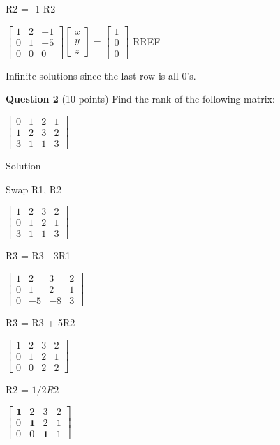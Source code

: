 \documentclass{article}
\begin{document}
R2 = -1 R2

$\begin{bmatrix}
1 & 2 & -1 \\
0 & 1 & -5\\
0 & 0 & 0
\end{bmatrix}\begin{bmatrix}
x \\ y \\ z    
\end{bmatrix} = \begin{bmatrix}
    1 \\ 0 \\ 0
\end{bmatrix}$ RREF

Infinite solutions since the last row is all 0's.

\vspace{2em}
\noindent
\textbf{Question 2} (10 points) Find the rank of the following matrix:

$\begin{bmatrix}
0 & 1 & 2 & 1 \\
1 & 2 & 3 & 2 \\
3 & 1 & 1 & 3 
\end{bmatrix}$ 

Solution

Swap R1, R2

$\begin{bmatrix}
    1 & 2 & 3 & 2 \\
    0 & 1 & 2 & 1 \\
    3 & 1 & 1 & 3
\end{bmatrix}$

R3 = R3 - 3R1

$\begin{bmatrix}
    1 & 2 & 3 & 2 \\
    0 & 1 & 2 & 1 \\
    0 & -5 & -8 & 3
\end{bmatrix}$ 

 R3 = R3 + 5R2

$\begin{bmatrix}
    1 & 2 & 3 & 2 \\
    0 & 1 & 2 & 1 \\
    0 & 0 & 2 & 2 
\end{bmatrix}$

R2 = $1/2R2$

$\begin{bmatrix}
    \textbf{1} & 2 & 3 & 2 \\
    0 & \textbf{1} & 2 & 1 \\
    0 & 0 & \textbf{1} & 1
\end{bmatrix}$
\end{document}
